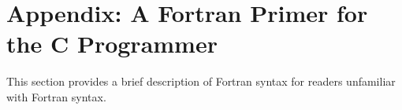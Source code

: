 \section*{Appendix: A Fortran Primer for the C Programmer}

This section provides a brief description of Fortran syntax for readers unfamiliar with Fortran syntax.
